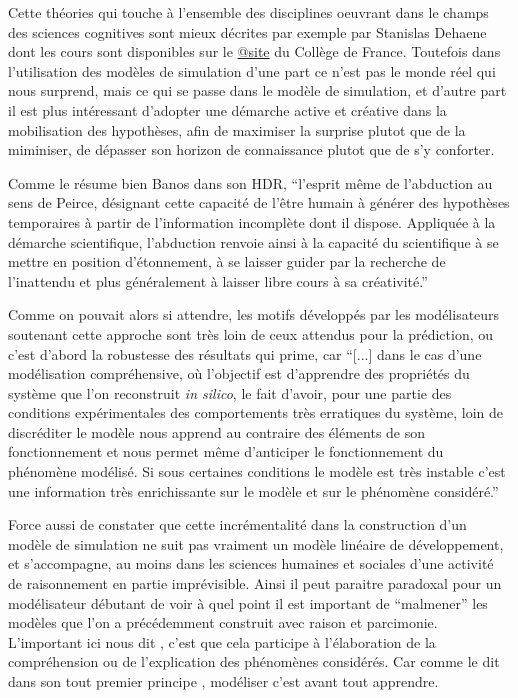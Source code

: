 Cette théories qui touche à l'ensemble des disciplines oeuvrant dans le champs des sciences cognitives sont mieux décrites par exemple par Stanislas Dehaene dont les cours sont disponibles sur le \href{http://www.college-de-france.fr/site/stanislas-dehaene}{@site} du Collège de France. Toutefois dans l'utilisation des modèles de simulation d'une part ce n'est pas le monde réel qui nous surprend, mais ce qui se passe dans le modèle de simulation, et d'autre part il est plus intéressant d'adopter une démarche active et créative dans la mobilisation des hypothèses, afin de maximiser la surprise plutot que de la miminiser, de dépasser son horizon de connaissance plutot que de s'y conforter. 

Comme le résume bien Banos dans son HDR, \enquote{l’esprit même de l’abduction au sens de Peirce, désignant cette capacité de l’être humain à générer des hypothèses temporaires à partir de l’information incomplète dont il dispose. Appliquée à la démarche scientifique, l’abduction renvoie ainsi à la capacité du scientifique à se mettre en position d’étonnement, à se laisser guider par la recherche de l’inattendu et plus généralement à laisser libre cours à sa créativité.} \autocite{Banos2013}

Comme on pouvait alors si attendre, les motifs développés par les modélisateurs soutenant cette approche sont très loin de ceux attendus pour la prédiction, ou c'est d'abord la robustesse des résultats qui prime, car \enquote{[...] dans le cas d’une modélisation compréhensive, où l’objectif est d’apprendre des propriétés du système que l’on reconstruit \textit{in silico}, le fait d’avoir, pour une partie des conditions expérimentales des comportements très erratiques du système, loin de discréditer le modèle nous apprend au contraire des éléments de son fonctionnement et nous permet même d’anticiper le fonctionnement du phénomène modélisé. Si sous certaines conditions le modèle est très instable c’est une information très enrichissante sur le modèle et sur le phénomène considéré.} \autocite{Amblard2010} 

Force aussi de constater que cette incrémentalité dans la construction d'un modèle de simulation ne suit pas vraiment un modèle linéaire de développement, et s'accompagne, au moins dans les sciences humaines et sociales d'une activité de raisonnement en partie imprévisible. Ainsi il peut paraitre paradoxal pour un modélisateur débutant de voir à quel point il est important de \enquote{malmener} les modèles que l'on a précédemment construit avec raison et parcimonie. L'important ici nous dit \textcite{Amblard2010}, c'est que cela participe à l'élaboration de la compréhension ou de l'explication des phénomènes considérés. Car comme le dit dans son tout premier principe \textcite[65]{Banos2013}, modéliser c'est avant tout apprendre.

